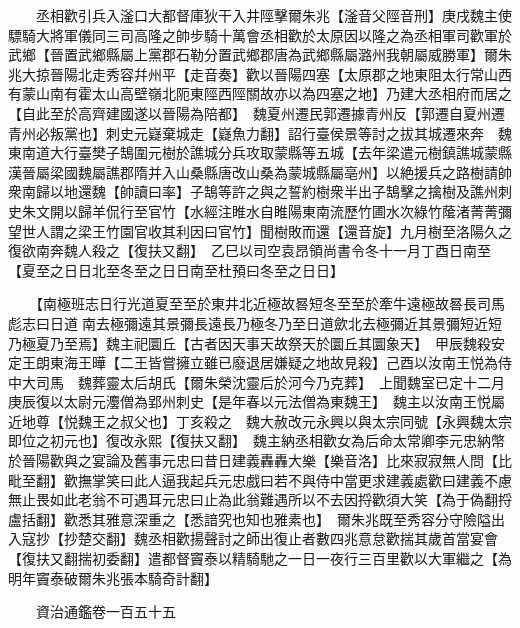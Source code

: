　　丞相歡引兵入滏口大都督庫狄干入井陘擊爾朱兆【滏音父陘音刑】庚戌魏主使驃騎大將軍儀同三司高隆之帥步騎十萬會丞相歡於太原因以隆之為丞相軍司歡軍於武鄉【晉置武鄉縣屬上黨郡石勒分置武鄉郡唐為武鄉縣屬潞州我朝屬威勝軍】爾朱兆大掠晉陽北走秀容幷州平【走音奏】歡以晉陽四塞【太原郡之地東阻太行常山西有蒙山南有霍太山高壁嶺北阨東陘西陘關故亦以為四塞之地】乃建大丞相府而居之【自此至於高齊建國遂以晉陽為陪都】　魏夏州遷民郭遷據青州反【郭遷自夏州遷青州必叛黨也】刺史元嶷棄城走【嶷魚力翻】詔行臺侯景等討之拔其城遷來奔　魏東南道大行臺樊子鵠圍元樹於譙城分兵攻取蒙縣等五城【去年梁遣元樹鎮譙城蒙縣漢晉屬梁國魏屬譙郡隋并入山桑縣唐改山桑為蒙城縣屬亳州】以絶援兵之路樹請帥衆南歸以地還魏【帥讀曰率】子鵠等許之與之誓約樹衆半出子鵠擊之擒樹及譙州刺史朱文開以歸羊侃行至官竹【水經注睢水自睢陽東南流歷竹圃水次綠竹䕃渚菁菁彌望世人謂之梁王竹園官收其利因曰官竹】聞樹敗而還【還音旋】九月樹至洛陽久之復欲南奔魏人殺之【復扶又翻】　乙巳以司空袁昂領尚書令冬十一月丁酉日南至【夏至之日日北至冬至之日日南至杜預曰冬至之日日】

　　【南極班志日行光道夏至至於東井北近極故晷短冬至至於牽牛遠極故晷長司馬彪志曰日道南去極彌遠其景彌長遠長乃極冬乃至日道歛北去極彌近其景彌短近短乃極夏乃至焉】魏主祀圜丘【古者因天事天故祭天於圜丘其圜象天】　甲辰魏殺安定王朗東海王曄【二王皆嘗擁立雖已廢退居嫌疑之地故見殺】己酉以汝南王悦為侍中大司馬　魏葬靈太后胡氏【爾朱榮沈靈后於河今乃克葬】　上聞魏室已定十二月庚辰復以太尉元灋僧為郢州刺史【是年春以元法僧為東魏王】　魏主以汝南王悦屬近地尊【悦魏王之叔父也】丁亥殺之　魏大赦改元永興以與太宗同號【永興魏太宗即位之初元也】復改永熙【復扶又翻】　魏主納丞相歡女為后命太常卿李元忠納幣於晉陽歡與之宴論及舊事元忠曰昔日建義轟轟大樂【樂音洛】比來寂寂無人問【比毗至翻】歡撫掌笑曰此人逼我起兵元忠戲曰若不與侍中當更求建義處歡曰建義不慮無止畏如此老翁不可遇耳元忠曰止為此翁難遇所以不去因捋歡須大笑【為于偽翻捋盧括翻】歡悉其雅意深重之【悉諳究也知也雅素也】　爾朱兆既至秀容分守險隘出入寇抄【抄楚交翻】魏丞相歡揚聲討之師出復止者數四兆意怠歡揣其歲首當宴會【復扶又翻揣初委翻】遣都督竇泰以精騎馳之一日一夜行三百里歡以大軍繼之【為明年竇泰破爾朱兆張本騎奇計翻】

　　資治通鑑卷一百五十五


    


 


 



 

 
  







